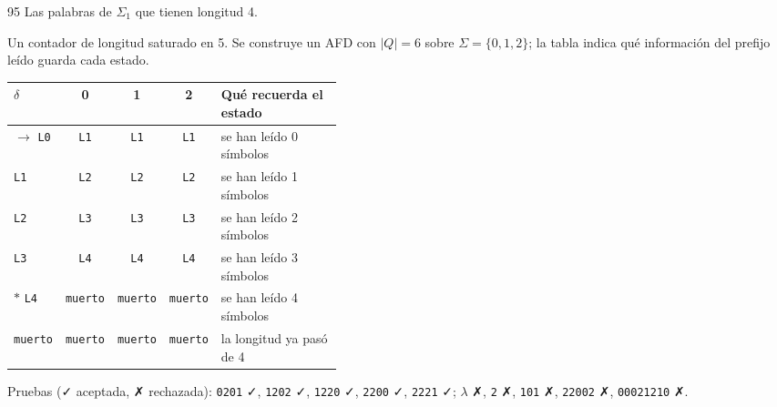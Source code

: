 \documentclass[11pt]{article}
\begin{document}
\begin{ejercicio}{95}{}
Las palabras de $\Sigma_1$ que tienen longitud 4.
\end{ejercicio}
\proc Un contador de longitud saturado en 5. Se construye un AFD con $|Q| = 6$ sobre $\Sigma = \{0, 1, 2\}$; la tabla indica qué información del prefijo leído guarda cada estado.
\begin{center}\small\begin{tabular}{lcccp{0.42\linewidth}}\toprule
$\delta$ & 0 & 1 & 2 & Qué recuerda el estado \\\midrule
$\to$ \texttt{L0} & \texttt{L1} & \texttt{L1} & \texttt{L1} & se han leído 0 símbolos \\
 \texttt{L1} & \texttt{L2} & \texttt{L2} & \texttt{L2} & se han leído 1 símbolos \\
 \texttt{L2} & \texttt{L3} & \texttt{L3} & \texttt{L3} & se han leído 2 símbolos \\
 \texttt{L3} & \texttt{L4} & \texttt{L4} & \texttt{L4} & se han leído 3 símbolos \\
$*$ \texttt{L4} & \texttt{muerto} & \texttt{muerto} & \texttt{muerto} & se han leído 4 símbolos \\
 \texttt{muerto} & \texttt{muerto} & \texttt{muerto} & \texttt{muerto} & la longitud ya pasó de 4 \\
\bottomrule\end{tabular}\end{center}
Pruebas (✓ aceptada, ✗ rechazada): \texttt{0201} ✓, \texttt{1202} ✓, \texttt{1220} ✓, \texttt{2200} ✓, \texttt{2221} ✓; $\lambda$ ✗, \texttt{2} ✗, \texttt{101} ✗, \texttt{22002} ✗, \texttt{00021210} ✗.
\end{document}
